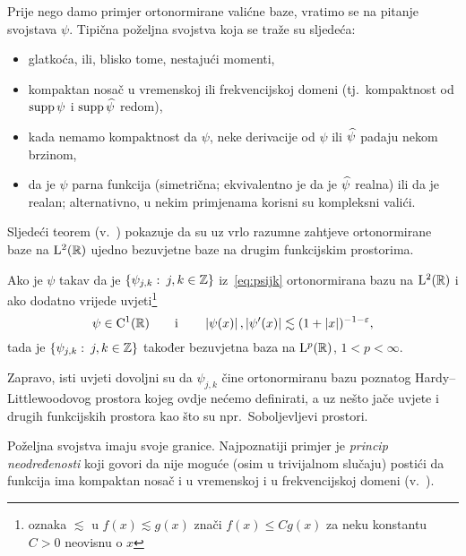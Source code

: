 \documentclass[main.tex]{subfiles}
\newcommand{\mr}[1]{\mathrm{#1}}
\begin{document}
Prije nego damo primjer ortonormirane valićne baze,
vratimo se na pitanje svojstava \( \psi \).
Tipična poželjna svojstva koja se traže su sljedeća:
\begin{itemize}
	\item glatkoća, ili, blisko tome, nestajući momenti,
	\item kompaktan nosač u vremenskoj ili frekvencijskoj domeni (tj.\ kompaktnost od \( \operatorname{supp} \psi \) i \( \operatorname{supp} \widehat{\psi} \) redom),
	\item kada nemamo kompaktnost da \( \psi \), neke derivacije od \( \psi \) ili \( \widehat{\psi} \) padaju nekom brzinom,
	\item da je \( \psi  \) parna funkcija (simetrična; ekvivalentno je da je \( \widehat{\psi} \) realna) ili da je
	      realan; alternativno, u nekim primjenama korisni su kompleksni valići.
\end{itemize}
Sljedeći teorem (v.~\cite[]{daub}) pokazuje da su uz vrlo razumne zahtjeve ortonormirane baze na
\( \mathrm{L}^2(\mathbb{R}) \) ujedno bezuvjetne baze na drugim funkcijskim prostorima.

\newcommand{\fusnota}{\footnote{oznaka \( \lesssim \) u \( f(x) \lesssim g(x) \) znači \( f(x) \le Cg(x) \) za neku konstantu \( C > 0 \) neovisnu o \( x \)}}
\begin{teorem} \label{bezbazaLp}
	Ako je \( \psi \) takav da je \( \left\{ \psi_{j,k} \, \colon \, j,k \in \mathbb{Z} \right\} \) iz~\eqref{eq:psijk} ortonormirana bazu na \( \mathrm{L}^2(\mathbb{R}) \) i ako dodatno vrijede uvjeti\fusnota
	\begin{equation} \label{dovuvjetipsi}
		\psi \in \mr C^1(\R) \qquad \mathrm i \qquad \abs{\psi(x)}, \abs{\psi'(x)} \lesssim (1 + \abs x)^{-1-\varepsilon},
	\end{equation}
	tada je \( \left\{ \psi_{j,k} \, \colon \, j,k \in \mathbb Z \right\} \) također bezuvjetna baza na \( \mathrm{L}^p(\mathbb{R}) \), \( 1 < p < \infty \).
\end{teorem}
Zapravo, isti uvjeti dovoljni su da \( \psi_{j,k} \) čine ortonormiranu bazu poznatog Hardy--Littlewoodovog
prostora kojeg ovdje nećemo definirati, a uz nešto jače uvjete i drugih funkcijskih prostora kao što
su npr.\ Soboljevljevi prostori.

Poželjna svojstva imaju svoje granice. Najpoznatiji
primjer je \emph{princip neodređenosti} koji govori
da nije moguće (osim u trivijalnom slučaju)
postići da funkcija ima kompaktan nosač i u
vremenskoj i u frekvencijskoj domeni (v.~\cite[theorem~4]{kovac-wroclaw}).
\end{document}
